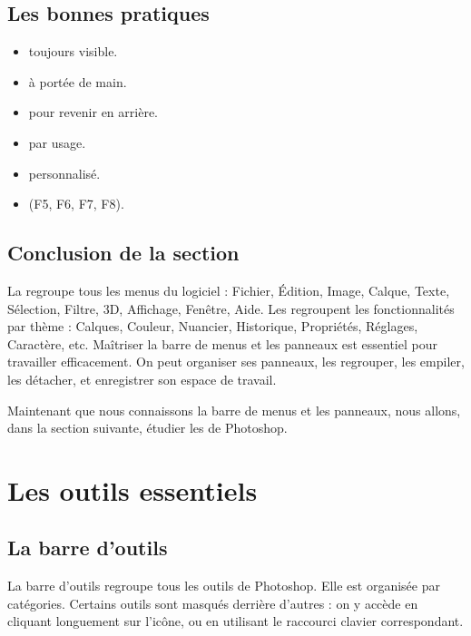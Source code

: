 \subsection{Les bonnes pratiques}

\begin{itemize}
    \item {} toujours visible.
    \item {} à portée de main.
    \item {} pour revenir en arrière.
    \item {} par usage.
    \item {} personnalisé.
    \item {} (F5, F6, F7, F8).
\end{itemize}

\subsection*{Conclusion de la section}

La  regroupe tous les menus du logiciel : Fichier, Édition, Image, Calque, Texte, Sélection, Filtre, 3D, Affichage, Fenêtre, Aide. Les  regroupent les fonctionnalités par thème : Calques, Couleur, Nuancier, Historique, Propriétés, Réglages, Caractère, etc. Maîtriser la barre de menus et les panneaux est essentiel pour travailler efficacement. On peut organiser ses panneaux, les regrouper, les empiler, les détacher, et enregistrer son espace de travail.

Maintenant que nous connaissons la barre de menus et les panneaux, nous allons, dans la section suivante, étudier les  de Photoshop.

\section{Les outils essentiels}

\subsection{La barre d'outils}

La barre d'outils regroupe tous les outils de Photoshop. Elle est organisée par catégories. Certains outils sont masqués derrière d'autres : on y accède en cliquant longuement sur l'icône, ou en utilisant le raccourci clavier correspondant.

